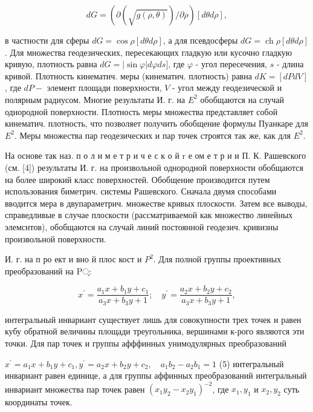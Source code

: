 \documentclass[10pt]{article}
\begin{document}
\[

d G=(\partial(\sqrt{g(\rho, \theta)}) / \partial \rho)[d \theta d \rho],

\]



в частности для сферы $d G=\cos \rho[d \theta d \rho]$, а для псевдосферы $d G=\operatorname{ch} \rho[d \theta d \rho]$. Для множества геодезических, пересекающих гладкую или кусочно гладкую кривую, плотность равна $d G=|\sin \varphi| d \varphi d s]$, где $\varphi$ - угол пересечения, $s$ - длина кривой. Плотность кинематич. меры (кинематич. плотность) равна $d K=[d P d V]$, где $d P-$ элемент площади поверхности, $V$ - угол между геодезической и полярным радиусом. Многие результаты И. г. на $E^{2}$ обобщаются на случай однородной поверхности. Плотность меры множества представляет собой кинематич. плотность, что позволяет получить обобщение формулы Пуанкаре для $E^{2}$. Меры множества пар геодезических и пар точек строятся так же, как для $E^{2}$.



На основе так наз. п о л и м е т р и ч е с к о й $\mathrm{r}$ е ом е т р и и П. К. Рашевского (см. [4]) результаты И. г. на произвольной однородной поверхности обобщаются на более широкий класс поверхностей. Обобщение производится путем использования биметрич. системы Рашевского. Сначала двумя способами вводится мера в двупараметрич. множестве кривых плоскости. Затем все выводы, справедливые в случае плоскости (рассматриваемой как множество линейных элемснтов), обобщаются на случай линий постоянной геодезич. кривизны произвольной поверхности.



И. г. на п ро ект и вно й плос кост и $P^{2}$. Для полной группы проективных преобразований на P्:



\[

x^{\prime}=\frac{a_{1} x+b_{1} y+c_{1}}{a_{3} x+b_{3} y+1} ; \quad y^{\prime}=\frac{a_{2} x+b_{2} y+c_{2}}{a_{3} x+b_{3} y+1},

\]



интегральный инвариант существует лишь для совокупности трех точек и равен кубу обратной величины площади треугольника, вершинами к-рого являются эти точки. Для пар точек и группы афффинных унимодулярных преобразований



$x^{\prime}=a_{1} x+b_{1} y+c_{1}, y^{\prime}=a_{2} x+b_{2} y+c_{2}, \quad a_{1} b_{2}-a_{2} b_{1}=1$ (5) интегральный инвариант равен единице, а для группы аффинных преобразований интегральный инвариант множества пар точек равен $\left(x_{1} y_{2}-x_{2} y_{1}\right)^{-2}$, где $x_{1}, y_{1}$ и $x_{2}, y_{2}$ суть координаты точек.
\end{document}
